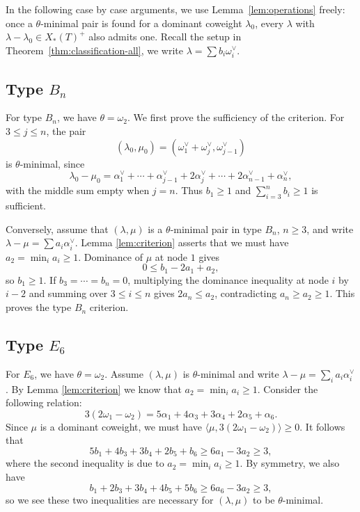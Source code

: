 \documentclass[a4paper, 12pt]{amsart}
\theoremstyle{definition}
\begin{document}
In the following case by case arguments, we use Lemma~\ref{lem:operations} freely: once a $\theta$-minimal pair is found for a dominant coweight $\lambda_0$, every $\lambda$ with $\lambda-\lambda_0\in X_*(T)^+$ also admits one. Recall the setup in Theorem~\ref{thm:classification-all},  we write $\lambda = \sum b_i \omega_i^{\vee}$. 

\subsection{Type $B_n$}\label{app:classification-B}
For type $B_n$,  we have $\theta=\omega_2$. We first prove the sufficiency of the criterion. For $3\le j\le n$, the pair
\[
(\lambda_0,\mu_0)=(\omega_1^\vee+\omega_j^\vee,\omega_{j-1}^\vee)
\]
is $\theta$-minimal, since
\[
\lambda_0-\mu_0
=\alpha_1^\vee+\cdots+\alpha_{j-1}^\vee
+2\alpha_j^\vee+\cdots+2\alpha_{n-1}^\vee+\alpha_n^\vee,
\]
with the middle sum empty when $j=n$. Thus $b_1\ge1$ and $\sum_{i=3}^n b_i\ge1$ is sufficient.

Conversely, assume that $(\lambda, \mu)$ is a $\theta$-minimal pair in type $B_n$, $n \geq 3$, and write $\lambda-\mu=\sum a_i\alpha_i^\vee$. Lemma \ref{lem:criterion} asserts that we must have $a_2=\min_i a_i\ge1$. Dominance of $\mu$ at node $1$ gives
\[
0\le b_1-2a_1+a_2,
\]
so $b_1\ge1$. If $b_3=\cdots=b_n=0$, multiplying the dominance inequality at node $i$ by $i-2$ and summing over $3\le i\le n$ gives $2a_n\le a_2$, contradicting $a_n\ge a_2\ge1$. This proves the type $B_n$ criterion.

\subsection{Type $E_6$}
For $E_6$, we have $\theta=\omega_2$.  Assume $(\lambda, \mu)$ is $\theta$-minimal and write $\lambda-\mu=\sum_i a_i\alpha_i^\vee$. By Lemma \ref{lem:criterion}  we know that $a_2=\min_i a_i\ge1$. Consider the following relation:
\[
3(2\omega_1-\omega_2)
=5\alpha_1+4\alpha_3+3\alpha_4+2\alpha_5+\alpha_6.
\]
Since $\mu$ is a dominant coweight, we must have  $\langle \mu, 3(2 \omega_1-\omega_2)\rangle\geq 0$. It follows that
\[
5b_1+4b_3+3b_4+2b_5+b_6\ge6a_1-3a_2\ge3,
\]
where the second inequality is due to $a_2 = \min_i a_i \geq 1$.
By symmetry, we also have
\[
b_1+2b_3+3b_4+4b_5+5b_6\ge6a_6-3a_2\ge3,
\]
so we see these two inequalities are necessary for $(\lambda, \mu)$ to be $\theta$-minimal.
\end{document}
